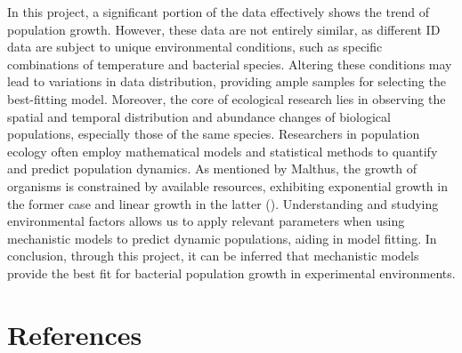 \documentclass[11pt]{article}
\begin{document}
In this project, a significant portion of the data effectively shows the trend of population growth. However, these data are not entirely similar, as different ID data are subject to unique environmental conditions, such as specific combinations of temperature and bacterial species. Altering these conditions may lead to variations in data distribution, providing ample samples for selecting the best-fitting model. Moreover, the core of ecological research lies in observing the spatial and temporal distribution and abundance changes of biological populations, especially those of the same species. Researchers in population ecology often employ mathematical models and statistical methods to quantify and predict population dynamics. As mentioned by Malthus, the growth of organisms is constrained by available resources, exhibiting exponential growth in the former case and linear growth in the latter (\cite{malthus_population_1798}). Understanding and studying environmental factors allows us to apply relevant parameters when using mechanistic models to predict dynamic populations, aiding in model fitting. In conclusion, through this project, it can be inferred that mechanistic models provide the best fit for bacterial population growth in experimental environments.

\section{References}

 
\end{document}
